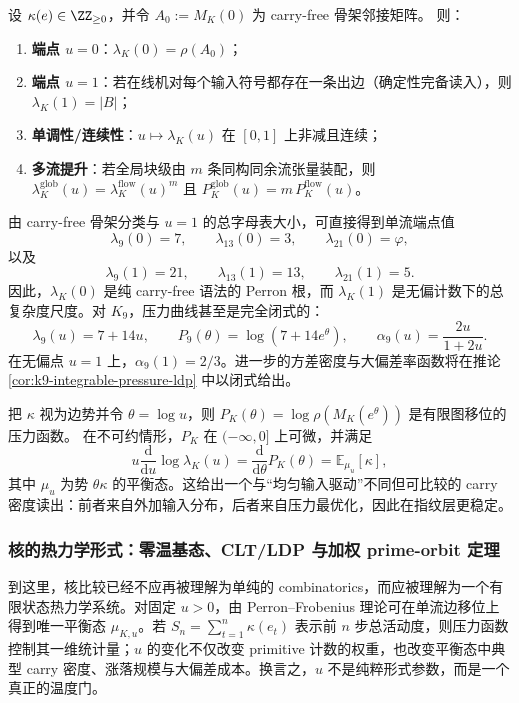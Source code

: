 \begin{proposition}[端点、单调性与多流提升]\label{prop:kernel-pressure-endpoints}
设 \(\kappa(e)\in\ZZ_{\ge 0}\)，并令 \(A_0:=M_K(0)\) 为 carry-free 骨架邻接矩阵。
则：
\begin{enumerate}
  \item \textbf{端点 \(u=0\)}：\(\lambda_K(0)=\rho(A_0)\)；
  \item \textbf{端点 \(u=1\)}：若在线机对每个输入符号都存在一条出边（确定性完备读入），则 \(\lambda_K(1)=|B|\)；
  \item \textbf{单调性/连续性}：\(u\mapsto \lambda_K(u)\) 在 \([0,1]\) 上非减且连续；
  \item \textbf{多流提升}：若全局块级由 \(m\) 条同构同余流张量装配，则
  \(
  \lambda^{\mathrm{glob}}_K(u)=\lambda^{\mathrm{flow}}_K(u)^m
  \)
  且
  \(
  P^{\mathrm{glob}}_K(u)=m\,P^{\mathrm{flow}}_K(u)
  \)。
\end{enumerate}
\end{proposition}

由 carry-free 骨架分类与 \(u=1\) 的总字母表大小，可直接得到单流端点值
\[
\lambda_9(0)=7,\qquad \lambda_{13}(0)=3,\qquad \lambda_{21}(0)=\varphi,
\]
以及
\[
\lambda_9(1)=21,\qquad \lambda_{13}(1)=13,\qquad \lambda_{21}(1)=5.
\]
因此，\(\lambda_K(0)\) 是纯 carry-free 语法的 Perron 根，而 \(\lambda_K(1)\) 是无偏计数下的总复杂度尺度。对 \(K_9\)，压力曲线甚至是完全闭式的：
\[
\lambda_9(u)=7+14u,
\qquad
P_9(\theta)=\log(7+14e^\theta),
\qquad
\alpha_9(u)=\frac{2u}{1+2u}.
\]
在无偏点 \(u=1\) 上，\(\alpha_9(1)=2/3\)。进一步的方差密度与大偏差率函数将在推论 \ref{cor:k9-integrable-pressure-ldp} 中以闭式给出。

\begin{remark}
把 \(\kappa\) 视为边势并令 \(\theta=\log u\)，则 \(P_K(\theta)=\log\rho(M_K(e^\theta))\) 是有限图移位的压力函数。
在不可约情形，\(P_K\) 在 \((-\infty,0]\) 上可微，并满足
\[
u\frac{\mathrm{d}}{\mathrm{d}u}\log\lambda_K(u)
=\frac{\mathrm{d}}{\mathrm{d}\theta}P_K(\theta)
=\mathbb{E}_{\mu_u}[\kappa],
\]
其中 \(\mu_u\) 为势 \(\theta\kappa\) 的平衡态。这给出一个与“均匀输入驱动”不同但可比较的 carry 密度读出：前者来自外加输入分布，后者来自压力最优化，因此在指纹层更稳定。
\end{remark}

\subsubsection{核的热力学形式：零温基态、CLT/LDP 与加权 prime-orbit 定理}\label{subsec:kernel-thermo}
到这里，核比较已经不应再被理解为单纯的 combinatorics，而应被理解为一个有限状态热力学系统。对固定 \(u>0\)，由 Perron--Frobenius 理论可在单流边移位上得到唯一平衡态 \(\mu_{K,u}\)。若 \(S_n=\sum_{t=1}^{n}\kappa(e_t)\) 表示前 \(n\) 步总活动度，则压力函数控制其一维统计量；\(u\) 的变化不仅改变 primitive 计数的权重，也改变平衡态中典型 carry 密度、涨落规模与大偏差成本。换言之，\(u\) 不是纯粹形式参数，而是一个真正的温度门。

